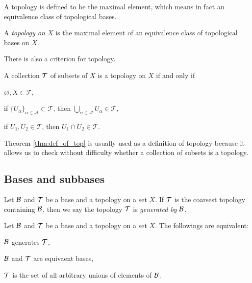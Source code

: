 \documentclass{../crs}
\begin{document}
A topology is defined to be the maximal element, which means in fact an equivalence class of topological bases.

\begin{defn}
A \emph{topology on $X$} is the maximal element of an equivalence class of topological bases on $X$.
\end{defn}

There is also a criterion for topology.

\begin{thm}\label{thm:def_of_top}
A collection $\mathcal{T}$ of subsets of $X$ is a topology on $X$ if and only if
\begin{cond}
\item $\varnothing,X\in\mathcal{T}$,
\item if $\{U_\alpha\}_{\alpha\in\mathcal{A}}\subset\mathcal{T}$, then $\bigcup_{\alpha\in\mathcal{A}}U_\alpha\in\mathcal{T}$,
\item if $U_1,U_2\in\mathcal{T}$, then $U_1\cap U_2\in\mathcal{T}$.
\end{cond}
\end{thm}
\begin{pf}

\end{pf}
Theorem \ref{thm:def_of_top} is usually used as a definition of topology because it allows us to check without difficulty whether a collection of subsets is a topology.








\subsection{Bases and subbases}

\begin{defn}
Let $\mathcal{B}$ and $\mathcal{T}$ be a base and a topology on a set $X$.
If $\mathcal{T}$ is the coarsest topology containing $\mathcal{B}$, then we say the topology $\mathcal{T}$ is \emph{generated by} $\mathcal{B}$.
\end{defn}
\begin{thm}
Let $\mathcal{B}$ and $\mathcal{T}$ be a base and a topology on a set $X$.
The followings are equivalent:
\begin{cond}
\item $\mathcal{B}$ generates $\mathcal{T}$,
\item $\mathcal{B}$ and $\mathcal{T}$ are equivaent bases,
\item $\mathcal{T}$ is the set of all arbitrary unions of elements of $\mathcal{B}$.
\end{cond}
\end{thm}
\end{document}
